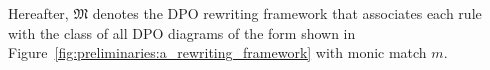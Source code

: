 Hereafter, \(\mathfrak{M}\) denotes the DPO rewriting framework that associates each rule with the class of all DPO diagrams of the form shown in Figure~\ref{fig:preliminaries:a_rewriting_framework} with monic match $m$.
